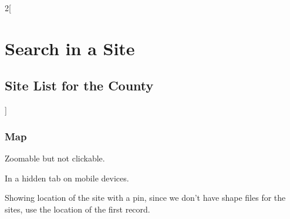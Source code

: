 \documentclass[a4paper,12pt,landscape]{article}
\begin{document}
\begin{multicols*}{2}[%
  \section{Search in a Site}%
  \subsection{Site List for the County}%
]
\subsubsection*{Map}

\begin{todolist}
  \item Zoomable but not clickable.
  \item In a hidden tab on mobile devices.
  \item Showing location of the site with a pin, since we don't have shape files for the sites,
   use the location of the first record.
\end{todolist}

\clearpage
\end{multicols*}

\end{document}
